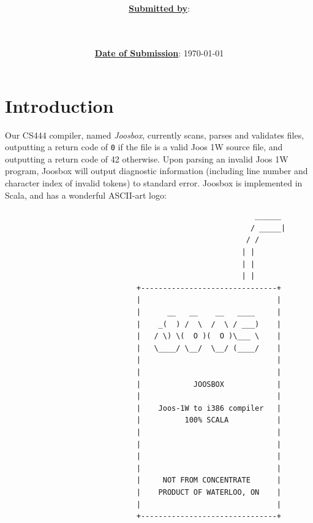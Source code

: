 \documentclass[letterpaper]{article}
\title{\course \\ \term \\ \project}
\date{\ul{\textbf{Date of Submission}}: \today}
\author{\ul{\textbf{Submitted by}}: \\ \indent \wenhao \\ \indent \chris \\ \indent \peter}
\begin{document}
  \maketitle
  \thispagestyle{empty}
  \clearpage

  \setcounter{page}{1}

  \clearpage
  \section{Introduction}

  Our CS444 compiler, named {\em Joosbox}, currently scans, parses and validates
  files, outputting a return code of {\tt 0} if the file is a valid Joos 1W source
  file, and outputting a return code of 42 otherwise. Upon parsing an invalid
  Joos 1W program, Joosbox will output diagnostic information (including line
  number and character index of invalid tokens) to standard error. Joosbox is
  implemented in Scala, and has a wonderful ASCII-art logo:

  \begin{verbatim}
                                                         ______
                                                        / _____|
                                                       / /
                                                      | |
                                                      | |
                                                      | |
                              +-------------------------------+
                              |                               |
                              |      __   __    __   ____     |
                              |    _(  ) /  \  /  \ / ___)    |
                              |   / \) \(  O )(  O )\___ \    |
                              |   \____/ \__/  \__/ (____/    |
                              |                               |
                              |                               |
                              |            JOOSBOX            |
                              |                               |
                              |    Joos-1W to i386 compiler   |
                              |          100% SCALA           |
                              |                               |
                              |                               |
                              |                               |
                              |                               |
                              |     NOT FROM CONCENTRATE      |
                              |    PRODUCT OF WATERLOO, ON    |
                              |                               |
                              +-------------------------------+
  \end{verbatim}
\end{document}
